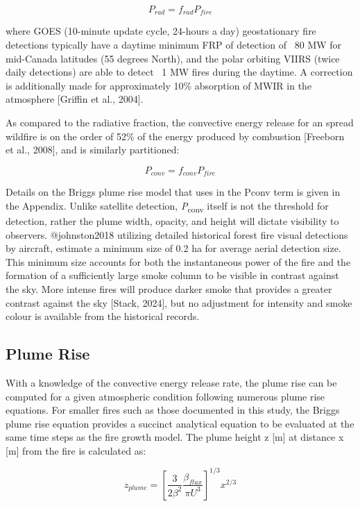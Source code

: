 \begin{equation}
P_{rad} = f_{rad}P_{fire}
\end{equation}

where GOES (10-minute update cycle, 24-hours a day) geostationary fire detections typically have a daytime minimum FRP of detection of ~80 MW for mid-Canada latitudes (55 degrees North), and the polar orbiting VIIRS (twice daily detections) are able to detect ~1 MW fires during the daytime. A correction is additionally made for approximately 10\% absorption of MWIR in the atmosphere [Griffin et al., 2004].

As compared to the radiative fraction, the convective energy release for an spread wildfire is on the order of 52\% of the energy produced by combustion [Freeborn et al., 2008], and is similarly partitioned:

\begin{equation}
P_{conv} = f_{conv}P_{fire}
\end{equation}

Details on the Briggs plume rise model that uses in the Pconv term is given in the Appendix. Unlike satellite detection, \textit{P}\textsubscript{conv} itself is not the threshold for detection, rather the plume width, opacity, and height will dictate visibility to observers. @johnston2018 utilizing detailed historical forest fire visual detections by aircraft, estimate a minimum size of 0.2 ha for average aerial detection size. This minimum size accounts for both the instantaneous power of the fire and the formation of a sufficiently large smoke column to be visible in contrast against the sky. More intense fires will produce darker smoke that provides a greater contrast against the sky [Stack, 2024], but no adjustment for intensity and smoke colour is available from the historical records.

\subsection{Plume Rise}

With a knowledge of the convective energy release rate, the plume rise can be computed for a given atmospheric condition following numerous plume rise equations. For smaller fires such as those documented in this study, the Briggs plume rise equation provides a succinct analytical equation to be evaluated at the same time steps as the fire growth model. The plume height z [m] at distance x [m] from the fire is calculated as:

\begin{equation}
z_{plume} = \left[\frac{3}{2\beta^{2}}\frac{\beta_{flux}}{\pi U^3}\right]^{1/3} x^{2/3}
\end{equation}


